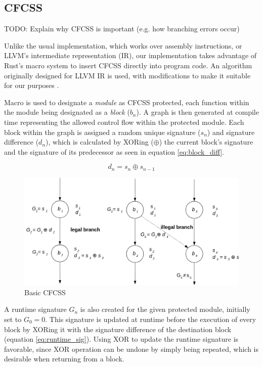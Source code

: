 \subsection{CFCSS}

TODO: Explain why CFCSS is important (e.g. how branching errors occur)

Unlike the usual implementation, which works over assembly instructions, or LLVM's intermediate representation (IR), our implementation takes advantage of Rust's macro system to insert CFCSS directly into program code. An algorithm originally designed for LLVM IR is used, with modifications to make it suitable for our purposes \cite{coast:cfcss}.

Macro is used to designate a \textit{module} as CFCSS protected, each function within the module being designated as a \textit{block} ({$b_n$}). A graph is then generated at compile time representing the allowed control flow within the protected module. Each block within the graph is assigned a random unique signature ({$s_n$}) and signature difference ({$d_n$}), which is calculated by XORing ({$\oplus$}) the current block's signature and the signature of its predecessor as seen in equation \ref{eq:block_diff}.

\begin{equation}
d_n = s_n \oplus s_{n-1}
\label{eq:block_diff}
\end{equation}

\begin{figure}[!h]
    \centering
    \includegraphics[width=1.0\textwidth]{diagrams/cfcss/basic.png}
    \caption{Basic CFCSS \cite{coast:cfcss}}
\end{figure}

A runtime signature {$G_n$} is also created for the given protected module, initially set to {$G_0 = 0$}. This signature is updated at runtime before the execution of every block by XORing it with the signature difference of the destination block (equation \ref{eq:runtime_sig}). Using XOR to update the runtime signature is favorable, since XOR operation can be undone by simply being repeated, which is desirable when returning from a block.

